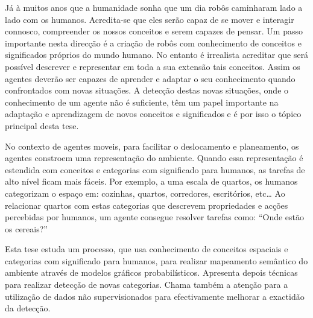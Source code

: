 Já à muitos anos que a humanidade sonha que um dia robôs caminharam lado a lado com os humanos.
Acredita-se que eles serão capaz de se mover e interagir connosco, compreender os nossos conceitos
e serem capazes de pensar.
Um passo importante nesta direcção é a criação de robôs com conhecimento de conceitos e significados
próprios do mundo humano.
No entanto é irrealista acreditar que será possível descrever e representar em toda a sua extensão
tais conceitos. Assim os agentes deverão ser capazes de aprender e adaptar o seu conhecimento quando
confrontados com novas situações.
A detecção destas novas situações, onde o conhecimento de um agente não é suficiente, têm um papel importante
na adaptação e aprendizagem de novos conceitos e significados e é por isso o tópico principal desta tese.

No contexto de agentes moveis, para facilitar o deslocamento e planeamento, os
agentes constroem uma representação do ambiente. Quando essa representação é estendida com
conceitos e categorias com significado para humanos, as tarefas de alto nível ficam mais fáceis.
Por exemplo, a uma escala de quartos, os humanos categorizam o espaço em: cozinhas, quartos, corredores,
escritórios, etc\dots
Ao relacionar quartos com estas categorias que descrevem propriedades e acções percebidas por
humanos, um agente consegue resolver tarefas como: ``Onde estão os cereais?''

Esta tese estuda um processo, que usa conhecimento de conceitos espaciais e categorias com significado
para humanos, para realizar mapeamento semântico do ambiente através de modelos gráficos probabilísticos.
Apresenta depois técnicas para realizar detecção de novas categorias. Chama também a atenção para a
utilização de dados não supervisionados para efectivamente melhorar a exactidão da detecção.


